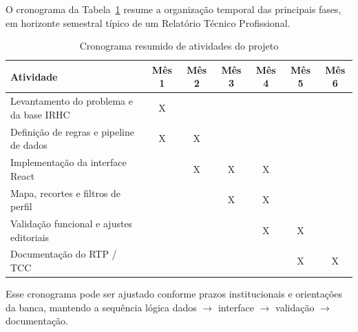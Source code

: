 O cronograma da Tabela~\ref{tab:cronograma} resume a organização temporal das principais fases, em horizonte semestral típico de um Relatório Técnico Profissional.

\begin{table}[H]
\centering
\caption{Cronograma resumido de atividades do projeto}
\label{tab:cronograma}
\scriptsize
\begin{tabularx}{\textwidth}{|l|c|c|c|c|c|c|}
\hline
\textbf{Atividade} & \textbf{Mês 1} & \textbf{Mês 2} & \textbf{Mês 3} & \textbf{Mês 4} & \textbf{Mês 5} & \textbf{Mês 6} \\
\hline
Levantamento do problema e da base IRHC & X & & & & & \\
\hline
Definição de regras e pipeline de dados & X & X & & & & \\
\hline
Implementação da interface React & & X & X & X & & \\
\hline
Mapa, recortes e filtros de perfil & & & X & X & & \\
\hline
Validação funcional e ajustes editoriais & & & & X & X & \\
\hline
Documentação do RTP / TCC & & & & & X & X \\
\hline
\end{tabularx}
\end{table}

Esse cronograma pode ser ajustado conforme prazos institucionais e orientações da banca, mantendo a sequência lógica dados $\rightarrow$ interface $\rightarrow$ validação $\rightarrow$ documentação.
